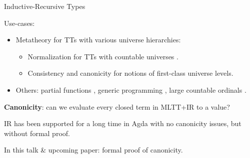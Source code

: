 \documentclass[dvipsnames,aspectratio=169]{beamer}
\begin{document}
\begin{frame}{Inductive-Recursive Types}

Use-cases:
\begin{itemize}
\item Metatheory for TTs with various universe hierarchies:
  \begin{itemize}
    \item Normalization for TTs with countable universes \cite{martin1975intuitionistic,DBLP:journals/pacmpl/0001OV18,DBLP:journals/pacmpl/PujetT23,DBLP:journals/pacmpl/AbelDE23}.
    \item Consistency \cite{first-class-univ} and canonicity \cite{DBLP:journals/corr/abs-2502-20485} for notions of first-class universe levels.
  \end{itemize}
\item Others: partial functions \cite{DBLP:conf/tphol/BoveC01}, generic programming \cite{DBLP:journals/njc/BenkeDJ03,diehl2017fully}, large countable ordinals \cite{ir-ordinals,btb-ordinal}.
\end{itemize}
\vspace{1em}
\pause

\textbf{Canonicity}: can we evaluate every closed term in MLTT+IR to a value?
\vspace{1em}

IR has been supported for a long time in Agda with no canonicity issues,
but without formal proof.
\vspace{1em}
\pause

In this talk \& upcoming paper: formal proof of canonicity.
\end{frame}
\end{document}
